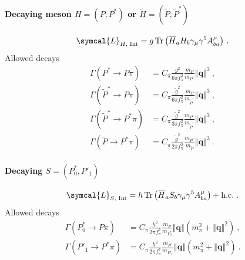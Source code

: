 \paragraph{Decaying meson $H = \left( P, P^* \right)$ or $\tilde{H} = \left( \tilde{P}, \tilde{P}^* \right)$}
\begin{equation}
  \symcal{L}_{H \text{, Int}} = g \tr{\left(\adj{H}_a H_b \gamma_\mu \gamma^5 A_{ba}^\mu \right)} \ .
\end{equation}
Allowed decays 
\begin{subequations}
  \begin{align}
    \Gamma \left( P^* \to P \pi \right) &= C_\pi \frac{g^2}{6 \pi f_\pi^2} \frac{m_P}{m_{P^*}} \left\Vert \symbf{q} \right\Vert^3 \ , \\
    \Gamma \left( \tilde{P}^* \to P \pi \right) &= C_\pi \frac{\tilde{g}^2}{6 \pi f_\pi^2} \frac{m_P}{m_{\tilde{P}^*}} \left\Vert \symbf{q} \right\Vert^3 \ , \\
    \Gamma \left( \tilde{P}^* \to P^* \pi \right) &= C_\pi \frac{\tilde{g}^2}{3 \pi f_\pi^2}\frac{m_{P^*}}{m_{\tilde{P}^*}} \left\Vert \symbf{q} \right\Vert^3 \ , \\
    \Gamma \left(\tilde{P} \to P^* \pi \right) &= C_\pi \frac{\tilde{g}^2}{2 \pi f_\pi^2} \frac{m_{P^*}}{m_{\tilde{P}}} \left\Vert \symbf{q} \right\Vert^3 \ .
  \end{align}
\end{subequations}

\paragraph{Decaying $S = \left( P^*_0, P'_1 \right)$}
\begin{equation}
  \symcal{L}_{S \text{, Int}} = h \tr{\left(\adj{H}_a S_b \gamma_\mu \gamma^5 A_{ba}^\mu \right)} + \text{h.c.} \ .
\end{equation}
Allowed decays
\begin{subequations}
  \begin{align}
    \Gamma \left( P^*_0 \to P \pi \right) &= C_\pi \frac{h^2}{2 \pi f_\pi^2} \frac{m_P}{m_{P^*_0}} \left\Vert \symbf{q} \right\Vert \left( m_\pi^2 + \left\Vert \symbf{q} \right\Vert^2 \right) \ , \\
    \Gamma \left( P'_1 \to P^* \pi \right) &= C_\pi \frac{h^2}{2 \pi f_\pi^2} \frac{m_{P^*}}{m_{P'_1}} \left\Vert \symbf{q} \right\Vert \left( m_\pi^2 + \left\Vert \symbf{q} \right\Vert^2 \right) \ .
  \end{align}
\end{subequations}


